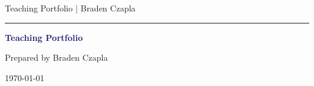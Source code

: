 \thispagestyle{empty} %
\begin{flushleft}
Teaching Portfolio | Braden Czapla
\hrule
\end{flushleft}

\begin{center}
\vspace*{2in}
{\Huge \textbf{\textcolor{MidnightBlue}{Teaching Portfolio}} }

\vspace*{4in}
{\large Prepared by Braden Czapla}

{\large \today }
\end{center}
